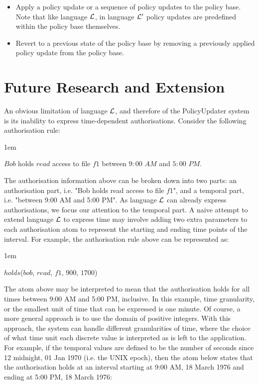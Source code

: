 \documentclass[global,twocolumn,final]{svjour}
\newenvironment{vquote}
  {\begin{list}{}{\leftmargin 1em}\item[]}
  {\end{list}}
\begin{document}
      \begin{itemize}
        \item
          Apply a policy update or a sequence of policy updates to the policy
          base. Note that like language ${\cal L}$, in language ${\cal L'}$
          policy updates are predefined within the policy base themselves.
        \item
          Revert to a previous state of the policy base by removing a
          previously applied policy update from the policy base.
      \end{itemize}

  \section{Future Research and Extension}
    \label{sec-future}

    An obvious limitation of language ${\cal L}$, and therefore of the
    PolicyUpdater system is its inability to express time-dependent
    authorisations. Consider the following authorisation rule:

    \begin{vquote}
      $Bob$ holds $read$ access to file $f1$ between $9:00$ $AM$ and $5:00$
      $PM$.
    \end{vquote}

    The authorisation information above can be broken down into two parts: an
    authorisation part, i.e. "Bob holds read access to file $f1$", and a
    temporal part, i.e. "between 9:00 AM and 5:00 PM". As language ${\cal L}$
    can already express authorisations, we focus our attention to the temporal
    part. A naive attempt to extend language ${\cal L}$ to express time may
    involve adding two extra parameters to each authorisation atom to represent
    the starting and ending time points of the interval. For example, the
    authorisation rule above can be represented as:

    \begin{vquote}
      $holds$($bob$, $read$, $f1$, $900$, $1700$)
    \end{vquote}

    The atom above may be interpreted to mean that the authorisation holds for
    all times between 9:00 AM and 5:00 PM, inclusive. In this example, time
    granularity, or the smallest unit of time that can be expressed is one
    minute. Of course, a more general approach is to use the domain of positive
    integers. With this approach, the system can handle different granularities
    of time, where the choice of what time unit each discrete value is
    interpreted as is left to the application. For example, if the temporal
    values are defined to be the number of seconds since 12 midnight, 01 Jan
    1970 (i.e. the UNIX epoch), then the atom below states that the
    authorisation holds at an interval starting at 9:00 AM, 18 March 1976 and
    ending at 5:00 PM, 18 March 1976:
\end{document}
